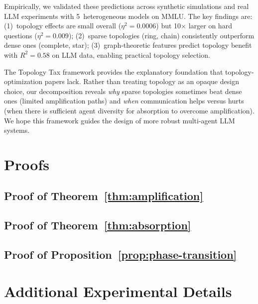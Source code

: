 \documentclass{article}
\begin{document}
Empirically, we validated these predictions across synthetic simulations and real LLM experiments with 5~heterogeneous models on MMLU. The key findings are: (1)~topology effects are small overall ($\eta^2 = 0.0006$) but 10$\times$ larger on hard questions ($\eta^2 = 0.009$); (2)~sparse topologies (ring, chain) consistently outperform dense ones (complete, star); (3)~graph-theoretic features predict topology benefit with $R^2 = 0.58$ on LLM data, enabling practical topology selection.

The Topology Tax framework provides the explanatory foundation that topology-optimization papers lack. Rather than treating topology as an opaque design choice, our decomposition reveals \emph{why} sparse topologies sometimes beat dense ones (limited amplification paths) and \emph{when} communication helps versus hurts (when there is sufficient agent diversity for absorption to overcome amplification). We hope this framework guides the design of more robust multi-agent LLM systems.






\newpage
\appendix

\section{Proofs}
\label{app:proofs}

\subsection{Proof of Theorem~\ref{thm:amplification}}

\subsection{Proof of Theorem~\ref{thm:absorption}}

\subsection{Proof of Proposition~\ref{prop:phase-transition}}

\section{Additional Experimental Details}
\label{app:experimental}
\end{document}
